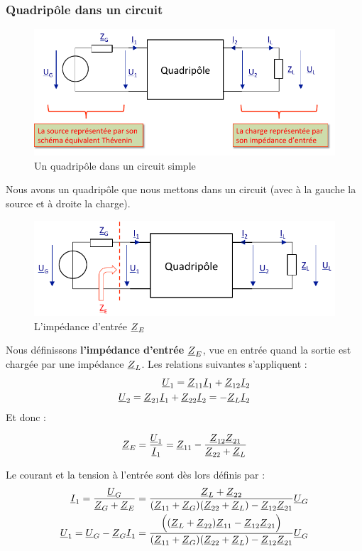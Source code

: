 \documentclass[12pt,a4paper]{article}
\newcommand{\uz}{\uline{Z} }
\newcommand{\ui}{\uline{I} }
\newcommand{\uu}{\uline{U} }
\begin{document}
\subsubsection{Quadripôle dans un circuit}
\begin{figure}[!h]
	\centering
	\includegraphics[scale=0.65]{images/quadripole_circuit_1}
	\caption{Un quadripôle dans un circuit simple}
\end{figure}
Nous avons un quadripôle que nous mettons dans un circuit (avec à la gauche la source et à droite la charge).
\begin{figure}[!h]
	\centering
	\includegraphics[scale=0.65]{images/quadripole_circuit_2}
	\caption{L'impédance d'entrée $\uz_E$}
\end{figure}
Nous définissons \textbf{l'impédance d'entrée $\uz_E$}, vue en entrée quand la sortie est chargée par une impédance $\uz_L$. Les relations suivantes s'appliquent :
\begin{align*}
	\uu_1 = \uz_{11}\ui_1 + \uz_{12}\ui_2\\
	\uu_2 = \uz_{21}\ui_1 + \uz_{22}\ui_2 = -\uz_L\ui_2
\end{align*}
Et donc :
\begin{boite}[0.6]
	\begin{equation}
		\uz_E = \frac{\uu_1}{\ui_1} = \uz_{11}-\frac{\uz_{12}\uz_{21}}{\uz_{22} + \uz_L}
		\label{equ: quadrip 1}
	\end{equation}
\end{boite}
Le courant et la tension à l'entrée sont dès lors définis par :
\begin{align}
	\ui_1 = \frac{\uu_G}{\uz_G + \uz_E} = \frac{\uz_L + \uz_{22}}{(\uz_{11} + \uz_{G})(\uz_{22} + \uz_{L}) - \uz_{12}\uz_{21}}\uu_G\\
	\uu_1 = \uu_G-\uz_G\ui_1 = \frac{\Big((\uz_L + \uz_{22})\uz_{11} - \uz_{12}\uz_{21}\Big)}{(\uz_{11} + \uz_G)(\uz_{22} + \uz_L) - \uz_{12}\uz_{21}} \uu_G
\end{align}
\end{document}
